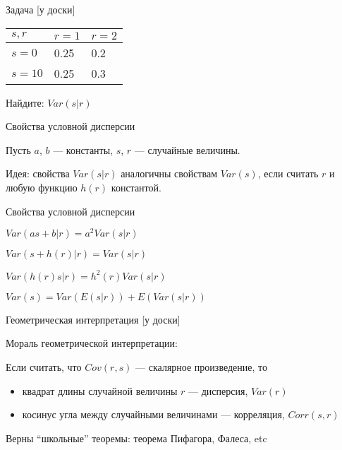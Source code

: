 \documentclass[ignorenonframetext,]{beamer}
\begin{document}
\begin{frame}{Задача {[}у доски{]}}

\begin{longtable}[c]{@{}lll@{}}
\toprule
\(s,r\) & \(r=1\) & \(r=2\)\tabularnewline
\midrule
\endhead
\(s=0\) & 0.25 & 0.2\tabularnewline
\(s=10\) & 0.25 & 0.3\tabularnewline
\bottomrule
\end{longtable}

Найдите: \(Var(s|r)\)

\end{frame}

\begin{frame}{Свойства условной дисперсии}

Пусть \(a\), \(b\) --- константы, \(s\), \(r\) --- случайные величины.

Идея: свойства \(Var(s|r)\) аналогичны свойствам \(Var(s)\), если
считать \(r\) и любую функцию \(h(r)\) константой.

\end{frame}

\begin{frame}{Свойства условной дисперсии}

\(Var(as+b|r)=a^2Var(s|r)\)

\(Var(s+h(r)|r)=Var(s|r)\)

\(Var(h(r)s|r)=h^2(r)Var(s|r)\)

\(Var(s)=Var(E(s|r))+E(Var(s|r))\)

\end{frame}

\begin{frame}{Геометрическая интерпретация {[}у доски{]}}

\begin{figure}
\end{figure}

\end{frame}

\begin{frame}{Мораль геометрической интерпретации:}

Если считать, что \(Cov(r,s)\) --- скалярное произведение, то

\begin{itemize}
\item
  квадрат длины случайной величины \(r\) --- дисперсия, \(Var(r)\)
\item
  косинус угла между случайными величинами --- корреляция, \(Corr(s,r)\)
\end{itemize}

Верны ``школьные'' теоремы: теорема Пифагора, Фалеса, etc

\end{frame}
\end{document}
